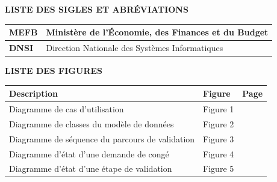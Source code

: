 \documentclass[12pt,a4paper]{article}
\begin{document}
\begin{center}
{\Large\bfseries LISTE DES SIGLES ET ABRÉVIATIONS}
\end{center}

\vspace{1cm}

\begin{center}
\renewcommand{\arraystretch}{2}
\begin{tabular}{|p{3cm}|p{11cm}|}
\hline
\textbf{MEFB} & Ministère de l'Économie, des Finances et du Budget \\ \hline
\textbf{DNSI} & Direction Nationale des Systèmes Informatiques \\ \hline
\end{tabular}
\end{center}


\clearpage

\begin{center}
{\Large\bfseries LISTE DES FIGURES}
\end{center}

\vspace{1cm}

\begin{center}
\renewcommand{\arraystretch}{1.8}
\begin{tabular}{|p{10cm}|p{2.6cm}|p{1.8cm}|}
\hline
\textbf{Description} & \textbf{Figure} & \textbf{Page} \\ \hline

Diagramme de cas d'utilisation & Figure 1 & \pageref{fig:cas-utilisation} \\ \hline
Diagramme de classes du modèle de données & Figure 2 & \pageref{fig:classes} \\ \hline
Diagramme de séquence du parcours de validation & Figure 3 & \pageref{fig:sequence} \\ \hline
Diagramme d'état d'une demande de congé & Figure 4 & \pageref{fig:etat-demande} \\ \hline
Diagramme d'état d'une étape de validation & Figure 5 & \pageref{fig:etat-etape} \\ \hline

\end{tabular}
\end{center}

\end{document}
